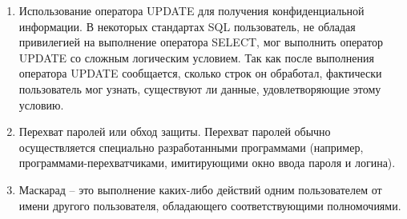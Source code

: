 \begin{itemize}
\begin{enumerate}
		\item Использование оператора UPDATE для получения конфиденциальной информации. В некоторых стандартах SQL пользователь, не обладая привилегией на выполнение оператора SELECT, мог выполнить оператор UPDATE со сложным логическим условием. Так как после выполнения оператора UPDATE сообщается, сколько строк он обработал, фактически пользователь мог узнать, существуют ли данные, удовлетворяющие этому условию.

		\item Перехват паролей или обход защиты. Перехват паролей обычно осуществляется специально разработанными программами (например, программами-перехватчиками, имитирующими окно ввода пароля и логина).

		\item Маскарад – это выполнение каких-либо действий одним пользователем от имени другого пользователя, обладающего соответствующими полномочиями.


\end{enumerate}
\end{itemize}
